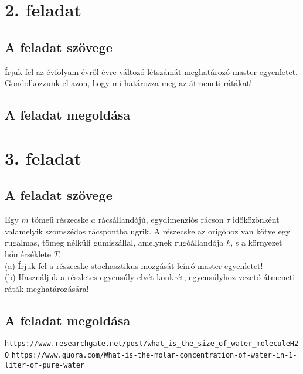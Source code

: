 \documentclass[12pt]{article}
\begin{document}
\section*{2. feladat}
\subsection*{A feladat szövege}
Írjuk fel az évfolyam évről-évre változó létszámát meghatározó master egyenletet. Gondolkozzunk el azon, hogy mi határozza meg az átmeneti rátákat!

\subsection*{A feladat megoldása}

\newpage
\section*{3. feladat}
\subsection*{A feladat szövege}
Egy $m$ tömeű részecske $a$ rácsállandójú, egydimenziós rácson $\tau$ időközönként valamelyik
szomszédos rácspontba ugrik. A részecske az origóhoz van kötve egy rugalmas, tömeg nélküli gumiszállal, amelynek rugóállandója $k$, s a környezet hőmérséklete $T$.\\
(a) Írjuk fel a részecske stochasztikus mozgását leíıró master egyenletet!\\
(b) Használjuk a részletes egyensúly elvét konkrét, egyensúlyhoz vezető átmeneti ráták meghatározására!

\subsection*{A feladat megoldása}
\begin{thebibliography}{9}

\texttt{https://www.researchgate.net/post/what\_{}is\_{}the\_{}size\_{}of\_{}water\_{}moleculeH2O}
\texttt{https://www.quora.com/What-is-the-molar-concentration-of-water-in-1-liter-of-pure-water}


\end{thebibliography}
\end{document}
